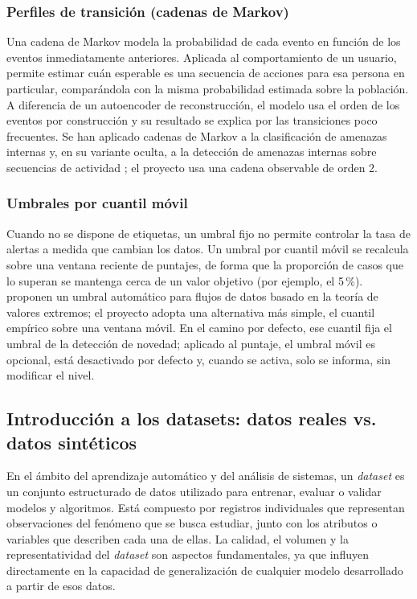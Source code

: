 \subsubsection{Perfiles de transición (cadenas de Markov)}
Una cadena de Markov modela la probabilidad de cada evento en función de los eventos inmediatamente anteriores. Aplicada al comportamiento de un usuario, permite estimar cuán esperable es una secuencia de acciones para esa persona en particular, comparándola con la misma probabilidad estimada sobre la población. A diferencia de un autoencoder de reconstrucción, el modelo usa el orden de los eventos por construcción y su resultado se explica por las transiciones poco frecuentes. Se han aplicado cadenas de Markov a la clasificación de amenazas internas \parencite{Kim2018Markov} y, en su variante oculta, a la detección de amenazas internas sobre secuencias de actividad \parencite{Rashid2016HMM}; el proyecto usa una cadena observable de orden 2.

\subsubsection{Umbrales por cuantil móvil}
Cuando no se dispone de etiquetas, un umbral fijo no permite controlar la tasa de alertas a medida que cambian los datos. Un umbral por cuantil móvil se recalcula sobre una ventana reciente de puntajes, de forma que la proporción de casos que lo superan se mantenga cerca de un valor objetivo (por ejemplo, el 5\,\%). \textcite{Siffer2017SPOT} proponen un umbral automático para flujos de datos basado en la teoría de valores extremos; el proyecto adopta una alternativa más simple, el cuantil empírico sobre una ventana móvil. En el camino por defecto, ese cuantil fija el umbral de la detección de novedad; aplicado al puntaje, el umbral móvil es opcional, está desactivado por defecto y, cuando se activa, solo se informa, sin modificar el nivel.

\subsection{Introducción a los datasets: datos reales vs. datos sintéticos}
En el ámbito del aprendizaje automático y del análisis de sistemas, un \emph{dataset} es un conjunto estructurado de datos utilizado para entrenar, evaluar o validar modelos y algoritmos. Está compuesto por registros individuales que representan observaciones del fenómeno que se busca estudiar, junto con los atributos o variables que describen cada una de ellas. La calidad, el volumen y la representatividad del \emph{dataset} son aspectos fundamentales, ya que influyen directamente en la capacidad de generalización de cualquier modelo desarrollado a partir de esos datos. 

